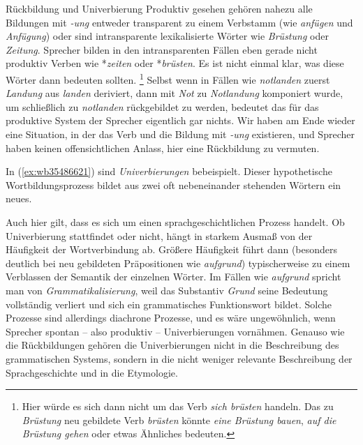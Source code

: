 \begin{Vertiefung}{Rückbildung und Univerbierung}
Produktiv gesehen gehören \zB nahezu alle Bildungen mit \textit{-ung} entweder transparent zu einem Verbstamm (wie \textit{anfügen} und \textit{Anfügung}) oder sind intransparente lexikalisierte Wörter wie \textit{Brüstung} oder \textit{Zeitung}.
Sprecher bilden in den intransparenten Fällen eben gerade nicht produktiv Verben wie *\textit{zeiten} oder *\textit{brüsten}.
Es ist nicht einmal klar, was diese Wörter dann bedeuten sollten.%
\footnote{Hier würde es sich dann nicht um das Verb \textit{sich brüsten} handeln.
Das zu \textit{Brüstung} neu gebildete Verb \textit{brüsten} könnte \zB \textit{eine Brüstung bauen}, \textit{auf die Brüstung gehen} oder etwas Ähnliches bedeuten.}
Selbst wenn in Fällen wie \textit{notlanden} zuerst \textit{Landung} aus \textit{landen} deriviert, dann mit \textit{Not} zu \textit{Notlandung} komponiert wurde, um schließlich zu \textit{notlanden} rückgebildet zu werden, bedeutet das für das produktive System der Sprecher eigentlich gar nichts.
Wir haben am Ende wieder eine Situation, in der das Verb und die Bildung mit \textit{-ung} existieren, und Sprecher haben keinen offensichtlichen Anlass, hier eine Rückbildung zu vermuten.

In (\ref{ex:wb35486621}) sind \textit{Univerbierungen} bebeispielt.
Dieser hypothetische Wortbildungsprozess bildet aus zwei oft nebeneinander stehenden Wörtern ein neues.

\begin{exe}
  \ex\label{ex:wb35486621} 
  \begin{xlist}
  \end{xlist}
\end{exe}

Auch hier gilt, dass es sich um einen sprachgeschichtlichen Prozess handelt.
Ob Univerbierung stattfindet oder nicht, hängt in starkem Ausmaß von der Häufigkeit der Wortverbindung ab.
Größere Häufigkeit führt dann (besonders deutlich \zB bei neu gebildeten Präpositionen wie \textit{aufgrund}) typischerweise zu einem Verblassen der Semantik der einzelnen Wörter.
Im Fällen wie \textit{aufgrund} spricht man von \textit{Grammatikalisierung}, weil das Substantiv \textit{Grund} seine Bedeutung vollständig verliert und sich ein grammatisches Funktionswort bildet.
Solche Prozesse sind allerdings diachrone Prozesse, und es wäre ungewöhnlich, wenn Sprecher spontan -- also produktiv -- Univerbierungen vornähmen.
Genauso wie die Rückbildungen gehören die Univerbierungen nicht in die Beschreibung des grammatischen Systems, sondern in die nicht weniger relevante Beschreibung der Sprachgeschichte und in die Etymologie.

\end{Vertiefung}



